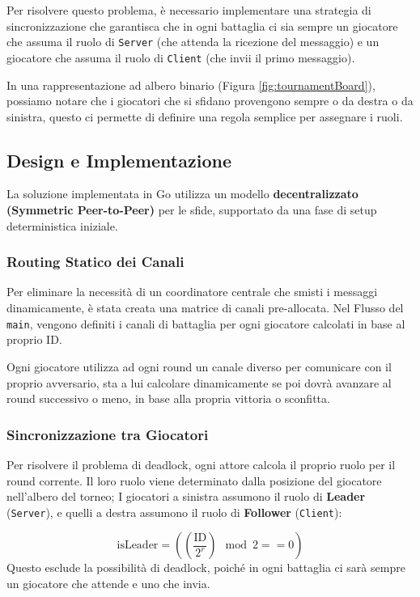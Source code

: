 Per risolvere questo problema, è necessario implementare una strategia di sincronizzazione che garantisca che in ogni battaglia ci sia sempre un giocatore che assuma il ruolo di \texttt{Server} (che attenda la ricezione del messaggio) e un giocatore che assuma il ruolo di \texttt{Client} (che invii il primo messaggio).

In una rappresentazione ad albero binario (Figura \ref{fig:tournamentBoard}), possiamo notare che i giocatori che si sfidano provengono sempre o da destra o da sinistra, questo ci permette di definire una regola semplice per assegnare i ruoli.

\subsection{Design e Implementazione}
La soluzione implementata in Go utilizza un modello \textbf{decentralizzato (Symmetric Peer-to-Peer)} per le sfide, supportato da una fase di setup deterministica iniziale.

\subsubsection{Routing Statico dei Canali}
Per eliminare la necessità di un coordinatore centrale che smisti i messaggi dinamicamente, è stata creata una matrice di canali pre-allocata. Nel Flusso del \texttt{main}, vengono definiti i canali di battaglia per ogni giocatore calcolati in base al proprio ID.

Ogni giocatore utilizza ad ogni round un canale diverso per comunicare con il proprio avversario, sta a lui calcolare dinamicamente se poi dovrà avanzare al round successivo o meno, in base alla propria vittoria o sconfitta.

\subsubsection{Sincronizzazione tra Giocatori}
Per risolvere il problema di deadlock, ogni attore calcola il proprio ruolo per il round corrente. Il loro ruolo viene determinato dalla posizione del giocatore nell'albero del torneo; I giocatori a sinistra assumono il ruolo di \textbf{Leader} (\texttt{Server}), e quelli a destra assumono il ruolo di \textbf{Follower} (\texttt{Client}):

\begin{equation}
    \text{isLeader} = (\left( \frac{\text{ID}}{2^r} \right) \mod 2 == 0)
\end{equation}
Questo esclude la possibilità di deadlock, poiché in ogni battaglia ci sarà sempre un giocatore che attende e uno che invia.

